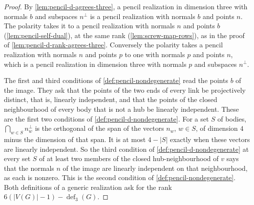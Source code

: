 \begin{proof}
  \leanok
  By \cref{lem:pencil-d-agrees-three}, a pencil realization in dimension
  three with normals $b$ and subspaces $n^{\perp}$ is a pencil realization
  with normals $b$ and points $n$. The polarity takes it to a pencil
  realization with normals $n$ and points $b$ (\cref{lem:pencil-self-dual}),
  at the same rank (\cref{lem:screw-map-rows}), as in the proof of
  \cref{lem:pencil-d-rank-agrees-three}. Conversely the polarity takes a
  pencil realization with normals $n$ and points $p$ to one with normals
  $p$ and points $n$, which is a pencil realization in dimension three
  with normals $p$ and subspaces $n^{\perp}$.

  The first and third conditions of \cref{def:pencil-nondegenerate} read
  the points $b$ of the image. They ask that the points of the two ends
  of every link be projectively distinct, that is, linearly independent,
  and that the points of the closed neighbourhood of every body that is
  not a hub be linearly independent. These are the first two conditions
  of \cref{def:pencil-d-nondegenerate}. For a set $S$ of bodies,
  $\bigcap_{w \in S} n_w^{\perp}$ is the orthogonal of the span of the
  vectors $n_w$, $w \in S$, of dimension $4$ minus the dimension of that
  span. It is at most $4 - |S|$ exactly when these vectors are linearly
  independent. So the third condition of
  \cref{def:pencil-d-nondegenerate} at every set $S$ of at least two
  members of the closed hub-neighbourhood of $v$ says that the normals
  $n$ of the image are linearly independent on that neighbourhood, as
  each is nonzero. This is the second condition of
  \cref{def:pencil-nondegenerate}. Both definitions of a generic
  realization ask for the rank $6(|V(G)| - 1) - \operatorname{def}_3(G)$.
\end{proof}

